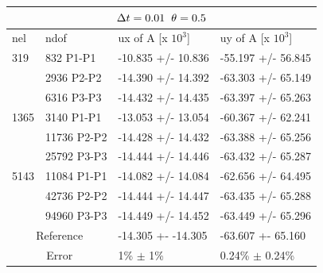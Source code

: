 \begin{table}[h!]
\centering
\label{CSM 3 Results 2}
\begin{tabular}{ |p{1cm}||p{2.7cm}|p{3.3cm}|p{3.3cm}|}
\hline
  \multicolumn{4}{|c|}{$\Delta t = 0.01 \hspace{2mm} \theta = 0.5$} \\
\hline
nel & ndof & ux of A [x $10^{3}$]  &uy of A [x $10^{3}$] \\
\hline
    319     & 832 P1-P1 & -10.835       +/-  10.836 & -55.197       +/-  56.845 \\
     & 2936 P2-P2 & -14.390       +/-  14.392 & -63.303       +/-  65.149 \\
      & 6316 P3-P3& -14.432       +/-  14.435 & -63.397       +/-  65.263 \\
    \hline
    1365    & 3140 P1-P1  & -13.053       +/-  13.054 & -60.367       +/-  62.241 \\
     & 11736 P2-P2  & -14.428       +/-  14.432 & -63.388       +/-  65.256 \\
     & 25792 P3-P3  & -14.444       +/-  14.446 & -63.432       +/-  65.287 \\
     \hline
     5143    & 11084 P1-P1 & -14.082       +/-  14.084 & -62.656       +/-  64.495 \\
     & 42736 P2-P2 & -14.444       +/-  14.447 & -63.435       +/-  65.288 \\
     & 94960 P3-P3& -14.449       +/-  14.452 & -63.449       +/-  65.296 \\
 \hline
  \multicolumn{2}{|c|}{Reference}  &-14.305 +- -14.305        & -63.607 +- 65.160    \\
   \hline
    \multicolumn{2}{|c|}{Error}  & 1\% $\pm$ 1\%   & 0.24\% $\pm$ 0.24\%\\
   \hline
\end{tabular}
\end{table}

